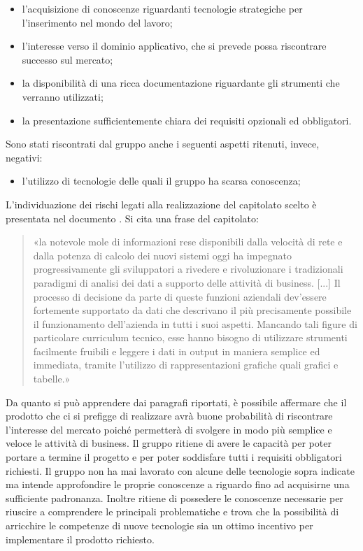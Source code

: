 		\begin{itemize}
			\item l'acquisizione di conoscenze riguardanti tecnologie strategiche per l'inserimento nel mondo del lavoro;
			\item l'interesse verso il dominio applicativo, che si prevede possa riscontrare successo sul mercato;
			\item la disponibilità di una ricca documentazione riguardante gli strumenti che verranno utilizzati;
			\item la presentazione sufficientemente chiara dei requisiti opzionali ed obbligatori.
		\end{itemize}
		Sono stati riscontrati dal gruppo anche i seguenti aspetti ritenuti, invece, negativi:
		\begin{itemize}
			\item l'utilizzo di tecnologie delle quali il gruppo ha scarsa conoscenza;
		\end{itemize}
			L'individuazione dei rischi legati alla realizzazione del capitolato scelto è presentata nel documento
			.
			Si cita una frase del capitolato:
			\begin{quotation}
				«la notevole mole di informazioni rese disponibili dalla velocità di rete e dalla potenza di calcolo dei nuovi sistemi oggi ha impegnato progressivamente gli sviluppatori a rivedere e rivoluzionare i tradizionali paradigmi di analisi dei dati a supporto delle attività di business. [...]
				Il processo di decisione da parte di queste funzioni aziendali dev’essere fortemente supportato da dati che descrivano il più precisamente possibile il funzionamento dell’azienda in tutti i suoi aspetti. Mancando tali figure di particolare curriculum tecnico, esse hanno bisogno di utilizzare strumenti facilmente fruibili e leggere i dati in output in maniera semplice ed immediata, tramite l’utilizzo di rappresentazioni grafiche quali grafici e tabelle.»
			\end{quotation}
			Da quanto si può apprendere dai paragrafi riportati, è possibile affermare che il prodotto che ci si prefigge di realizzare avrà buone probabilità di riscontrare l'interesse del mercato poiché permetterà di svolgere in modo più semplice e veloce le attività di business.
		Il gruppo \groupname{} ritiene di avere le capacità per poter portare a termine il progetto e per poter soddisfare tutti i requisiti obbligatori richiesti. Il gruppo non ha mai lavorato con alcune delle tecnologie sopra indicate ma intende approfondire le proprie conoscenze a riguardo fino ad acquisirne una sufficiente padronanza. Inoltre ritiene di possedere le conoscenze necessarie per riuscire a comprendere le principali problematiche e trova che la possibilità di arricchire le competenze di nuove tecnologie sia un ottimo incentivo per implementare il prodotto richiesto.
